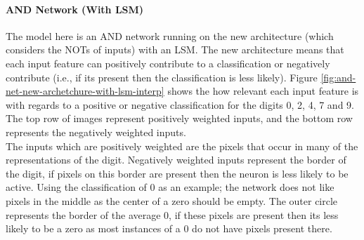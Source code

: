 \paragraph{AND Network (With LSM)}
The model here is an AND network running on the new architecture (which considers the NOTs of inputs) with an LSM. The new architecture means that each input feature can positively contribute to a classification or negatively contribute (i.e., if its present then the classification is less likely). Figure \ref{fig:and-net-new-archetchure-with-lsm-interp} shows the how relevant each input feature is with regards to a positive or negative classification for the digits 0, 2, 4, 7 and 9. The top row of images represent positively weighted inputs, and the bottom row represents the negatively weighted inputs.\\

The inputs which are positively weighted are the pixels that occur in many of the representations of the digit. Negatively weighted inputs represent the border of the digit, if pixels on this border are present then the neuron is less likely to be active. Using the classification of 0 as an example; the network does not like pixels in the middle as the center of a zero should be empty. The outer circle represents the border of the average 0, if these pixels are present then its less likely to be a zero as most instances of a 0 do not have pixels present there.


